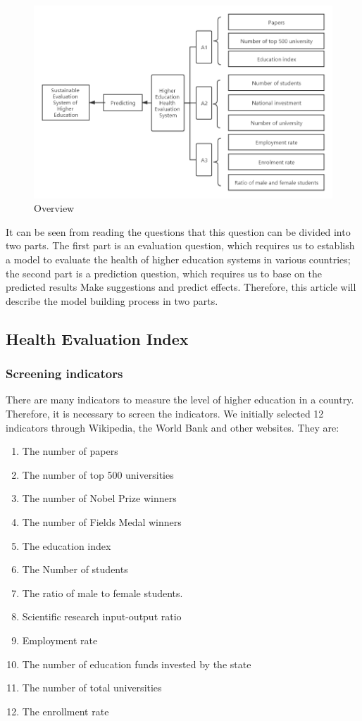 \documentclass[12pt]{article}  %
\begin{document}
\begin{figure}[h!]
\centering
\includegraphics[scale=0.5]{biao2.png}
\caption{Overview}
\label{fig:GVT}
\end{figure}


It can be seen from reading the questions that this question can be divided into two parts. The first part is an evaluation question, which requires us to establish a model to evaluate the health of higher education systems in various countries; the second part is a prediction question, which requires us to base on the predicted results Make suggestions and predict effects. Therefore, this article will describe the model building process in two parts.

\subsection{Health Evaluation Index}
\subsubsection{Screening indicators}

There are many indicators to measure the level of higher education in a country. Therefore, it is necessary to screen the indicators. We initially selected 12 indicators through Wikipedia, the World Bank and other websites. They are:

\begin{enumerate}[\bfseries 1.]
    \item The number of papers 
    \item The number of top 500 universities 
    \item The number of Nobel Prize winners
    \item The number of Fields Medal winners
    \item The education index
    \item The Number of students
    \item The ratio of male to female students.
    \item Scientific research input-output ratio
    \item Employment rate
    \item The number of education funds invested by the state
    \item The number of total universities
    \item The enrollment rate
\end{enumerate}
\end{document}
